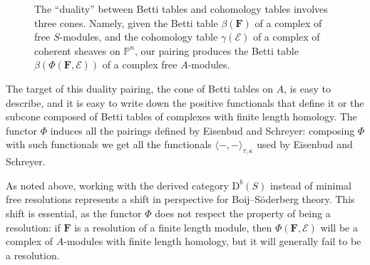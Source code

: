 \documentclass[12pt]{amsart}
\theoremstyle{definition}
\theoremstyle{remark}
\newcommand{\PP}{\mathbb{P}}
\newcommand{\cE}{\mathcal{E}}
\newcommand{\FF}{\mathbf{F}}
\newcommand{\DD}{\mathrm{D}}
\newcommand{\CQ}{\mathrm{C}}
\newcommand{\BBQ}{\mathrm{B}}
\begin{document}
\begin{figure}
\caption{The ``duality'' between Betti tables and cohomology tables involves three cones.  Namely, given the Betti table $\beta(\FF)$ of a complex of free $S$-modules, and the cohomology table $\gamma(\cE)$ of a complex of coherent sheaves on $\PP^n$, our pairing produces the Betti table $\beta(\Phi(\FF,\cE))$ of a complex free $A$-modules.
}
\label{fig:bracket}
\end{figure}

The target of this duality pairing, the cone of Betti tables on $A$, is easy to describe, and it is easy to write down the positive functionals that define it or the subcone composed of Betti tables of complexes with finite length homology. 
The functor $\Phi$ induces all the pairings defined by Eisenbud and Schreyer: composing $\Phi$ with such functionals we get all the functionals $\langle -,-\rangle_{\tau,\kappa}$ used by Eisenbud and Schreyer.

As noted above, working with the derived category $\DD^b(S)$ instead of minimal free resolutions represents a shift in perspective for Boij--S\"oderberg theory.  This shift is essential, as the functor $\Phi$ does not respect the property of being a resolution: if $\FF$ is a resolution of a finite length module, then $\Phi(\FF,\cE)$ will be a complex of $A$-modules with finite length homology, but it will generally fail to be a resolution.  
\end{document}
